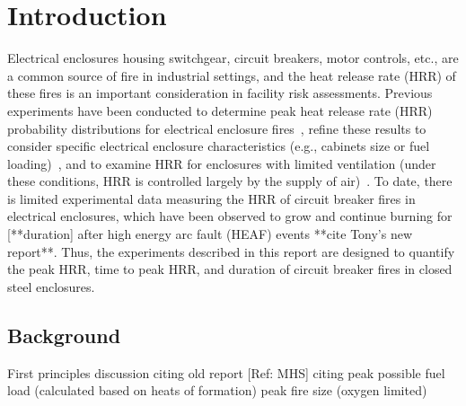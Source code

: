 \documentclass[12pt]{article}
\begin{document}
\pagebreak


\section{Introduction}

Electrical enclosures housing switchgear, circuit breakers, motor controls, etc., are a common source of fire in industrial settings, and the heat release rate (HRR) of these fires is an important consideration in facility risk assessments. Previous experiments have been conducted to determine peak heat release rate (HRR) probability distributions for electrical enclosure fires~\cite{NUREG/CR-7197}, refine these results to consider specific electrical enclosure characteristics (e.g., cabinets size or fuel loading)~\cite{NUREG-2178}, and to examine HRR for enclosures with limited ventilation (under these conditions, HRR is controlled largely by the supply of air)~\cite{OLIVE-FIRE}. To date, there is limited experimental data measuring the HRR of circuit breaker fires in electrical enclosures, which have been observed to grow and continue burning for [**duration] after high energy arc fault (HEAF) events **cite Tony's new report**. Thus, the experiments described in this report are designed to quantify the peak HRR, time to peak HRR, and duration of circuit breaker fires in closed steel enclosures.

\subsection{Background}
First principles discussion citing old report [Ref: MHS] citing peak possible fuel load (calculated based on heats of formation)
peak fire size (oxygen limited)
\end{document}
